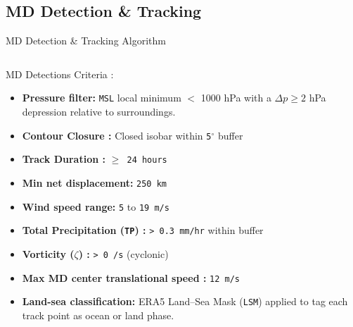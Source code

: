 \documentclass[10pt, aspectratio=169,t,xcolor=table]{beamer}
\begin{document}
\subsection{MD Detection \& Tracking}
\begin{frame}{MD Detection \& Tracking Algorithm}
	\vspace{-0.4cm}
	\begin{columns}[T]
		\begin{block}{\small MD Detections Criteria :}
			\begin{itemize}\footnotesize
				\item \textbf{Pressure filter:} \texttt{MSL} local minimum $<$ 1000 hPa with a
				      $\Delta p \geq 2$ hPa depression relative to surroundings.
				\item \textbf{Contour Closure :} Closed isobar within \texttt{5$^{\circ}$} buffer
				\item \textbf{Track Duration :} \texttt{$\geq$ 24 hours}
				\item \textbf{Min net displacement:} \texttt{250 km}
				\item \textbf{Wind speed range\footnotemark[1] :} \texttt{5} to \texttt{19 m/s}
				\item \textbf{Total Precipitation (\texttt{TP}) :} \texttt{> 0.3 mm/hr} within buffer
				\item \textbf{Vorticity (\texttt{$\zeta$}) :} \texttt{> 0 /s} (cyclonic)
				\item \textbf{Max MD center translational speed :} \texttt{12 m/s}
				\item \textbf{Land-sea classification:} ERA5 Land–Sea Mask (\texttt{LSM}) applied to
				      tag each track point as ocean or land phase.
			\end{itemize}
		\end{block}

		\vfill


\end{columns}
\end{frame}
\end{document}
